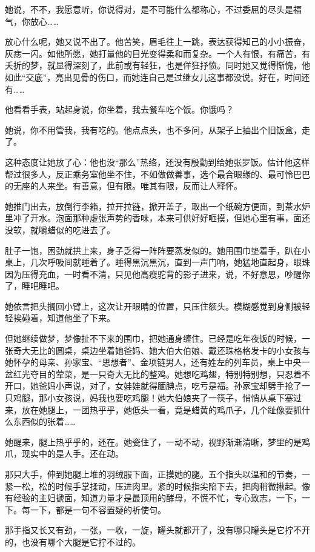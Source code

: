\documentclass[lang=cn,newtx,12pt,scheme=chinese]{elegantbook}
\begin{document}
她说，不不，我愿意听，你说得对，是不可能什么都称心，不过委屈的尽头是福气，你放心……

放心什么呢，她又说不出了。他苦笑，眉毛往上一跳，表达获得知己的小小振奋，灰痣一闪。如他所愿，她打量他的目光变得柔和而复杂。一个人有恨，有痛苦，有夭折的梦，就显得深刻了，此前或有轻狂，也是佯狂抒愤。同时她又觉得惭愧，他如此“交底”，亮出见骨的伤口，而她连自己是过继女儿这事都没说。好在，时间还有……

他看看手表，站起身说，你坐着，我去餐车吃个饭。你饿吗？

她说，你不用管我，我有吃的。他点点头，也不多问，从架子上抽出个旧饭盒，走了。

这种态度让她放了心：他也没“那么”热络，还没有殷勤到给她张罗饭。估计他这样帮过很多人，反正乘务室他坐不住，不如做做善事，选个最合眼缘的、最可怜巴巴的无座的人来坐。有善意，但有限。唯其有限，反而让人释怀。

她推门出去，放倒行李箱，拉开拉链，掀开盖子，取出一个纸碗方便面，到茶水炉里冲了开水。泡面那种虚张声势的香味，本来可供好好咂摸，但她心里有事，面还没软，就嚼蜡似的吃进去了。

肚子一饱，困劲就拱上来，身子乏得一阵阵要蒸发似的。她用围巾垫着手，趴在小桌上，几次呼吸间就睡着了。睡得黑沉黑沉，直到一声门响，她猛地直起身，眼珠因为压得充血，一时看不清，只见他高瘦驼背的影子进来，说，不好意思，吵醒你了，睡吧睡吧。

她依言把头搁回小臂上，这次让开眼睛的位置，只压住额头。模糊感觉到身侧被轻轻挨碰着，知道他坐了下来。

但她继续做梦，梦像扯不下来的围巾，把她通身缠住。已经是吃年夜饭的时候，一张奇大无比的圆桌，桌边坐着她爸妈、她大伯大伯娘、戴还珠格格发卡的小女孩与她怀孕的母亲、孙家宝、“思想者”、金项链男人，还有姓左的列车员，桌上中央一盆红光夺目的荤菜，是一只奇大无比的整鸡。她想吃鸡翅，特别特别想，只忍着不开口，她爸妈小声说，对了，女娃娃就得腼腆点，吃亏是福。孙家宝却劈手抢了一只鸡腿，那小女孩说，妈我也要吃鸡腿！她大伯娘夹了一筷子，悄悄从桌下塞过来，放在她腿上，一团热乎乎，她低头一看，竟是蜡黄的鸡爪子，几个趾像要抓什么东西似的张着……

她醒来，腿上热乎乎的，还在。她瓷住了，一动不动，视野渐渐清晰，梦里的是鸡爪，现实中的是人手。还在动。

那只大手，伸到她腿上堆的羽绒服下面，正摸她的腿。五个指头以温和的节奏，一紧一松，松的时候手掌揉动，压进肉里。紧的时候指尖陷下去，把肉稍微揪起。像有经验的主妇搋面，知道力量才是最顶用的酵母，不慌不忙，专心致志，一下，一下。每一下，都是一句不容置疑的祈使句。

那手指又长又有劲，一张，一收，一旋，罐头就都开了，没有哪只罐头是它拧不开的，也没有哪个大腿是它拧不过的。
\end{document}
